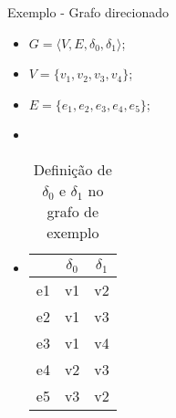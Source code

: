 \begin{frame}{Exemplo - Grafo direcionado}
    \begin{itemize}
        \item $G = \langle V, E, \delta_0, \delta_1\rangle$;
        \item $V = \{v_1, v_2, v_3, v_4\}$;
        \item $E = \{e_1, e_2, e_3, e_4, e_5\}$;
        \item[]
        \item[] 
        \begin{table}[htbp]
            \centering
            \begin{tabular}{|c|c|c|}
                \hline
                & $\delta_0$ & $\delta_1$ \\
                \hline
                e1 & v1 & v2 \\
                \hline
                e2 & v1 & v3 \\
                \hline
                e3 & v1 & v4 \\
                \hline
                e4 & v2 & v3 \\
                \hline
                e5 & v3 & v2 \\
                \hline
            \end{tabular}
            \caption[Definição de $\delta_0$ e $\delta_1$ no Exemplo 1]{Definição de $\delta_0$ e $\delta_1$ no grafo de exemplo}
            \label{tab:Grafo1}
        \end{table}
    \end{itemize}
\end{frame}
